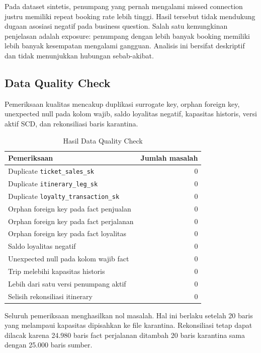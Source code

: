 Pada dataset sintetis, penumpang yang pernah mengalami missed connection justru
memiliki repeat booking rate lebih tinggi. Hasil tersebut tidak mendukung dugaan
asosiasi negatif pada business question. Salah satu kemungkinan penjelasan adalah
exposure: penumpang dengan lebih banyak booking memiliki lebih banyak kesempatan
mengalami gangguan. Analisis ini bersifat deskriptif dan tidak menunjukkan hubungan
sebab-akibat.

\subsection{Data Quality Check}

Pemeriksaan kualitas mencakup duplikasi surrogate key, orphan foreign key,
unexpected null pada kolom wajib, saldo loyalitas negatif, kapasitas historis,
versi aktif SCD, dan rekonsiliasi baris karantina.

\begin{table}[htbp]
\centering
\small
\caption{Hasil Data Quality Check}
\label{tab:hasil-dq}
\begin{tabular}{|p{}|r|}
\hline
\textbf{Pemeriksaan} & \textbf{Jumlah masalah} \\
\hline
Duplicate \texttt{ticket\_sales\_sk} & 0 \\
Duplicate \texttt{itinerary\_leg\_sk} & 0 \\
Duplicate \texttt{loyalty\_transaction\_sk} & 0 \\
Orphan foreign key pada fact penjualan & 0 \\
Orphan foreign key pada fact perjalanan & 0 \\
Orphan foreign key pada fact loyalitas & 0 \\
Saldo loyalitas negatif & 0 \\
Unexpected null pada kolom wajib fact & 0 \\
Trip melebihi kapasitas historis & 0 \\
Lebih dari satu versi penumpang aktif & 0 \\
Selisih rekonsiliasi itinerary & 0 \\
\hline
\end{tabular}
\end{table}

Seluruh pemeriksaan menghasilkan nol masalah. Hal ini berlaku setelah 20 baris
yang melampaui kapasitas dipisahkan ke file karantina. Rekonsiliasi tetap dapat
dilacak karena 24.980 baris fact perjalanan ditambah 20 baris karantina sama
dengan 25.000 baris sumber.

